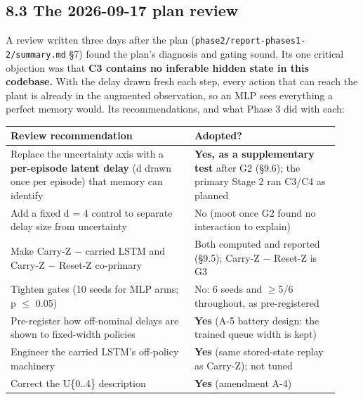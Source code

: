 \documentclass[11pt]{article}
\begin{document}
\subsection*{8.3 The 2026-09-17 plan review}



A review written three days after the plan (\texttt{phase2/\allowbreak{}report-phases1-2/\allowbreak{}summary.\allowbreak{}md} \S{}7) found the plan's diagnosis and gating sound. Its one critical objection was that \textbf{C3 contains no inferable hidden state in this codebase.} With the delay drawn fresh each step, every action that can reach the plant is already in the augmented observation, so an MLP sees everything a perfect memory would. Its recommendations, and what Phase 3 did with each:



\begin{center}\small\begin{tabular}{>{\raggedright\arraybackslash}p{0.522\linewidth}>{\raggedright\arraybackslash}p{0.412\linewidth}}
\toprule
Review recommendation & Adopted? \\
\midrule
Replace the uncertainty axis with a \textbf{per-episode latent delay} (d drawn once per episode) that memory can identify & \textbf{Yes, as a supplementary test} after G2 (\S{}9.6); the primary Stage 2 ran C3/C4 as planned \\
Add a fixed d = 4 control to separate delay size from uncertainty & No (moot once G2 found no interaction to explain) \\
Make Carry-Z $-$ carried LSTM and Carry-Z $-$ Reset-Z co-primary & Both computed and reported (\S{}9.5); Carry-Z $-$ Reset-Z is G3 \\
Tighten gates (10 seeds for MLP arms; p $\leq$ 0.05) & No: 6 seeds and $\geq$5/6 throughout, as pre-registered \\
Pre-register how off-nominal delays are shown to fixed-width policies & \textbf{Yes} (A-5 battery design: the trained queue width is kept) \\
Engineer the carried LSTM's off-policy machinery & \textbf{Yes} (same stored-state replay as Carry-Z); not tuned \\
Correct the U\{0..4\} description & \textbf{Yes} (amendment A-4) \\
\bottomrule
\end{tabular}\end{center}
\end{document}
